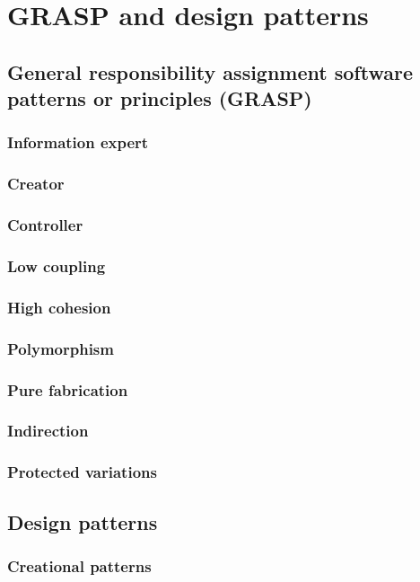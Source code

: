 \chapter{GRASP and design patterns}\label{chapter:design-patterns}

\section{General responsibility assignment software patterns or principles (GRASP)}



\subsection{Information expert}
\subsection{Creator}
\subsection{Controller}
\subsection{Low coupling}
\subsection{High cohesion}
\subsection{Polymorphism}
\subsection{Pure fabrication}
\subsection{Indirection}
\subsection{Protected variations}


\section{Design patterns}

\subsection{Creational patterns}

